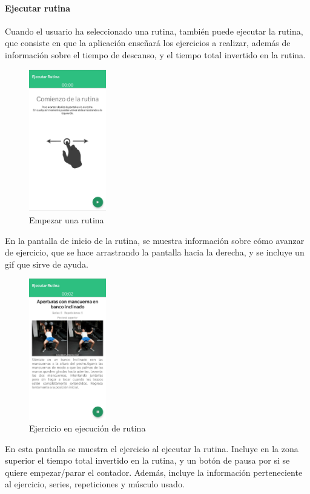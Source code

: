 \documentclass[11pt,a4paper]{report}
\begin{document}
\paragraph{Ejecutar rutina}
Cuando el usuario ha seleccionado una rutina, también puede ejecutar la rutina, que consiste en que la aplicación enseñará los ejercicios a realizar, además de información sobre el tiempo de descanso, y el tiempo total invertido en la rutina.
\begin{figure}[H]
	\centering
	\includegraphics[width=0.3\textwidth]{graficos/manual/EmpezarRutina.jpg}
	\caption{Empezar una rutina}
\end{figure}
En la pantalla de inicio de la rutina, se muestra información sobre cómo avanzar de ejercicio, que se hace arrastrando la pantalla hacia la derecha, y se incluye un gif que sirve de ayuda.
\begin{figure}[H]
	\centering
	\includegraphics[width=0.3\textwidth]{graficos/manual/EjercicioEnEmpezarRutina.jpg}
	\caption{Ejercicio en ejecución de rutina}
\end{figure}

En esta pantalla se muestra el ejercicio al ejecutar la rutina. Incluye en la zona superior el tiempo total invertido en la rutina, y un botón de pausa por si se quiere empezar/parar el contador. Además, incluye la información perteneciente al ejercicio, series, repeticiones y músculo usado.
\end{document}

